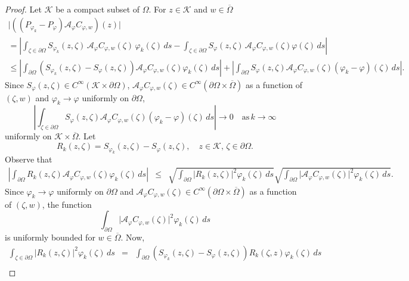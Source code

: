 \documentclass[10pt,a4paper]{amsart}
\begin{document}
\begin{proof}
Let $\mathcal{K}$ be a compact subset of $\Omega$. For $z\in\mathcal{K}$ and $w\in\overline{\Omega}$
\begin{multline*}
\vert ((P_{\varphi_k}-P_{\varphi})\mathcal{A}_{\varphi} C_{\varphi,w})(z)\vert\\
=
\left\lvert
\int_{\zeta\in\partial\Omega} S_{\varphi_k}(z,\zeta)\,\mathcal{A}_{\varphi} C_{\varphi,w}(\zeta)\,\varphi_k(\zeta) \,ds
-
\int_{\zeta\in\partial\Omega} S_{\varphi}(z,\zeta)\,\mathcal{A}_{\varphi} C_{\varphi,w}(\zeta)\varphi(\zeta) \,ds 
\right\rvert
\\
\leq
\left\lvert
\int_{\partial\Omega} (S_{\varphi_k}(z,\zeta)-S_{\varphi}(z,\zeta))\mathcal{A}_{\varphi} C_{\varphi,w}(\zeta) \varphi_k(\zeta)\,ds
\right\rvert 
+
\left\lvert
\int_{\partial\Omega} S_{\varphi}(z,\zeta)\mathcal{A}_{\varphi} C_{\varphi,w}(\zeta) (\varphi_k-\varphi)(\zeta)\,ds
\right\rvert.
\end{multline*}
Since $S_{\varphi}(z,\zeta)\in C^{\infty}(\mathcal{K}\times \partial\Omega)$, $\mathcal{A}_{\varphi} C_{\varphi,w}(\zeta)\in C^{\infty}(\partial\Omega\times \overline{\Omega})$ as a function of $(\zeta,w)$ and $\varphi_k\rightarrow\varphi$ uniformly on $\partial\Omega$, 
\[
\left\lvert
\int_{\zeta\in\partial\Omega} S_{\varphi}(z,\zeta)\mathcal{A}_{\varphi} C_{\varphi,w}(\zeta) (\varphi_k-\varphi)(\zeta)\,ds
\right\rvert
\rightarrow 0
\quad \text{as}\,k\rightarrow\infty
\]
uniformly on $\mathcal{K}\times\overline{\Omega}$. Let 
\[
R_k(z,\zeta)
=
S_{\varphi_k}(z,\zeta)-S_{\varphi}(z,\zeta), 
\quad
z\in\mathcal{K},\, \zeta\in\partial\Omega.
\]
Observe that
\begin{eqnarray*}
\left\lvert
\int_{\partial\Omega} R_k(z,\zeta)\mathcal{A}_{\varphi} C_{\varphi,w}(\zeta) \varphi_k(\zeta)\,ds
\right\rvert
&\leq&
\sqrt{\int_{\partial\Omega} \vert R_k(z,\zeta)\vert^2 \varphi_k(\zeta)\,ds}
\sqrt{\int_{\partial\Omega} \vert \mathcal{A}_{\varphi} C_{\varphi,w}(\zeta)\vert^2 \varphi_k(\zeta)\,ds}.
\end{eqnarray*}
Since $\varphi_k\rightarrow\varphi$ uniformly on $\partial\Omega$ and $\mathcal{A}_{\varphi} C_{\varphi,w}(\zeta)\in C^{\infty}(\partial\Omega\times\overline{\Omega})$ as a function of $(\zeta,w)$, the function
\[
\int_{\partial\Omega} \vert \mathcal{A}_{\varphi} C_{\varphi,w}(\zeta)\vert^2 \varphi_k(\zeta)\,ds
\]
is uniformly bounded for $w\in\overline{\Omega}$. Now,
\begin{eqnarray*}
\int_{\zeta\in\partial\Omega} \vert R_k(z,\zeta)\vert^2 \varphi_k(\zeta)\,ds
&=&
\int_{\partial\Omega} (S_{\varphi_k}(z,\zeta)-S_{\varphi}(z,\zeta)) R_k(\zeta,z) \varphi_k(\zeta)\,ds\\

\end{eqnarray*}
\end{proof}
\end{document}
